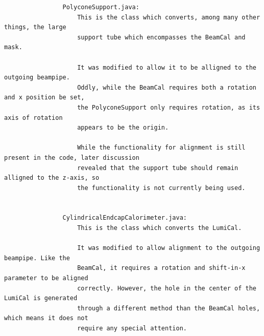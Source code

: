 \documentclass{report}
\begin{document}
\begin{verbatim}
                PolyconeSupport.java:
                    This is the class which converts, among many other things, the large
                    support tube which encompasses the BeamCal and mask.

                    It was modified to allow it to be alligned to the outgoing beampipe.
                    Oddly, while the BeamCal requires both a rotation and x position be set,
                    the PolyconeSupport only requires rotation, as its axis of rotation
                    appears to be the origin.

                    While the functionality for alignment is still present in the code, later discussion
                    revealed that the support tube should remain alligned to the z-axis, so
                    the functionality is not currently being used.


                CylindricalEndcapCalorimeter.java:
                    This is the class which converts the LumiCal.

                    It was modified to allow alignment to the outgoing beampipe. Like the
                    BeamCal, it requires a rotation and shift-in-x parameter to be aligned
                    correctly. However, the hole in the center of the LumiCal is generated
                    through a different method than the BeamCal holes, which means it does not
                    require any special attention.
            \end{verbatim}
\end{document}
